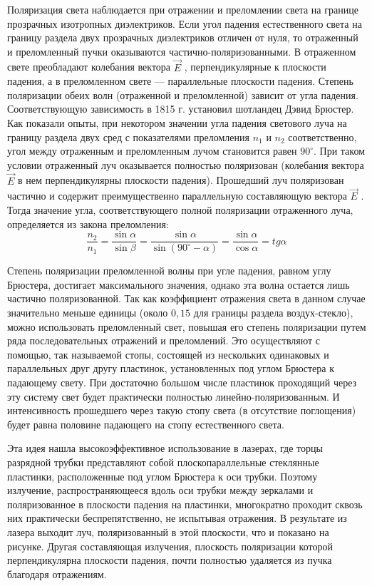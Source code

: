 \documentclass[12pt]{article}
\begin{document}
    Поляризация света наблюдается при отражении и преломлении света на границе прозрачных изотропных диэлектриков. Если угол падения естественного света на границу раздела двух прозрачных диэлектриков отличен от нуля, то отраженный и преломленный пучки оказываются частично-поляризованными. В отраженном свете преобладают колебания вектора $ \vec{E} $ , перпендикулярные к плоскости падения, а в преломленном свете --- параллельные плоскости падения. Степень поляризации обеих волн (отраженной и преломленной) зависит от угла падения. Соответствующую зависимость в 1815 г. установил шотландец Дэвид Брюстер. Как показали опыты, при некотором значении угла падения светового луча на границу раздела двух сред с показателями преломления $ n_1 $ и $ n_2 $ соответственно, угол между отраженным и преломленным лучом становится равен $ 90^\circ $. При таком условии отраженный луч оказывается полностью поляризован (колебания вектора $ \vec{E} $  в нем перпендикулярны плоскости падения). Прошедший луч поляризован частично и содержит преимущественно параллельную составляющую вектора $ \vec{E} $ . Тогда значение угла, соответствующего полной поляризации отраженного луча, определяется из закона преломления:
    \begin{equation}
        \label{eq:bru}
        \frac{n_2}{n_1} = \frac{\sin{\alpha}}{\sin{\beta}} = \frac{\sin{\alpha}}{\sin{(90^\circ  - \alpha)}} = \frac{\sin{\alpha}}{\cos{\alpha}} = tg{\alpha}
    \end{equation}

    Степень поляризации преломленной волны при угле падения, равном углу Брюстера, достигает максимального значения, однако эта волна остается лишь частично поляризованной. Так как коэффициент отражения света в данном случае значительно меньше единицы (около $ 0,15 $ для границы раздела воздух-стекло), можно использовать преломленный свет, повышая его степень поляризации путем ряда последовательных отражений и преломлений. Это осуществляют с помощью, так называемой стопы, состоящей из нескольких одинаковых и параллельных друг другу пластинок, установленных под углом Брюстера к падающему свету. При достаточно большом числе пластинок проходящий через эту систему свет будет практически полностью линейно-поляризованным. И интенсивность прошедшего через такую стопу света (в отсутствие поглощения) будет равна половине падающего на стопу естественного света.

    Эта идея нашла высокоэффективное использование в лазерах, где торцы разрядной трубки представляют собой плоскопараллельные стеклянные пластинки, расположенные под углом Брюстера к оси трубки. Поэтому излучение, распространяющееся вдоль оси трубки между зеркалами и поляризованное в плоскости падения на пластинки, многократно проходит сквозь них практически беспрепятственно, не испытывая отражения. В результате из лазера выходит луч, поляризованный в этой плоскости, что и показано на рисунке. Другая составляющая излучения, плоскость поляризации которой перпендикулярна плоскости падения, почти полностью удаляется из пучка благодаря отражениям.
\end{document}
